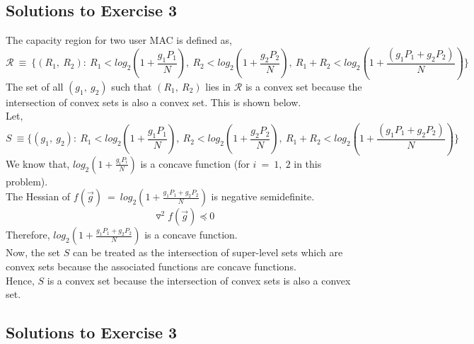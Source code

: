 \documentclass[12pt, draftcls, onecolumn]{IEEEtran}
\begin{document}
\subsection{Solutions to Exercise 3}
The capacity region for two user MAC is defined as,
\[\mathcal{R}\ \equiv\ \{(R_1,\ R_2):\ R_1<log_2(1+\frac{g_1P_1}{N}),\ R_2<log_2(1+\frac{g_2P_2}{N}),\ R_1+R_2<log_2(1+\frac{(g_1P_1 + g_2P_2)}{N})\}\]
The set of all $(g_1,\ g_2)$ such that $(R_1,\ R_2)$ lies in $\mathcal{R}$ is a convex set because the intersection of convex sets is also a convex set. This is shown below.
\\Let,
\[S\ \equiv \{(g_1,\ g_2):\ R_1<log_2(1+\frac{g_1P_1}{N}),\ R_2<log_2(1+\frac{g_2P_2}{N}),\ R_1+R_2<log_2(1+\frac{(g_1P_1 + g_2P_2)}{N})\}\]
We know that, $log_2(1+\frac{g_i P_i}{N})$ is a concave function (for $i\ =\ 1,\ 2$ in this problem).
\\The Hessian of $f(\Vec{g})\ =\ log_2(1+\frac{g_1 P_1 + g_2 P_2}{N})$ is negative semidefinite.
\[\triangledown^2 f(\Vec{g}) \preccurlyeq 0\]
Therefore, $log_2(1+\frac{g_1 P_1 + g_2 P_2}{N})$ is a concave function.
\\Now, the set $S$ can be treated as the intersection of super-level sets which are convex sets because the associated functions are concave functions.
\\Hence, $S$ is a convex set because the intersection of convex sets is also a convex set.
\subsection{Solutions to Exercise 3}
\end{document}
